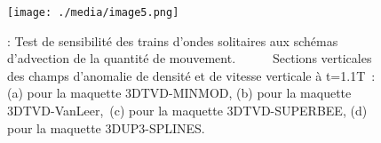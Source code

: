 \documentclass[12pt]{article}
\begin{document}

\begin{figure}[H]
	\begin{Center}
		\texttt{[image: ./media/image5.png]}
		\caption{: Test de sensibilité des trains d’ondes solitaires aux schémas d’advection de la quantité de mouvement.\ \ \ \ \ \   Sections verticales des champs d’anomalie de densité et de vitesse verticale à t=1.1T : (a)  pour la maquette 3DTVD-MINMOD, (b) pour la maquette 3DTVD-VanLeer,\  (c)  pour la maquette 3DTVD-SUPERBEE, (d) pour la maquette 3DUP3-SPLINES.}
		\label{fig:_Test_de_sensibilit_des_trains_dondes_solitaires_aux_schmas_dadvection_de_la_quantit_de_mouvement________Sections_verticales_des_champs_danomalie_de_densit_et_de_vitesse_verticale__t11T_a__pour_la_maquette_3DTVDMINMOD_b_pour_la_maquette_3DTVDVanLeer__c__pour_la_maquette_3DTVDSUPERBEE_d_pour_la_maquette_3DUP3SPLINES}
	\end{Center}
\end{figure}



\par

\par


\vspace{\baselineskip}

\vspace{\baselineskip}

\printbibliography
\end{document}
